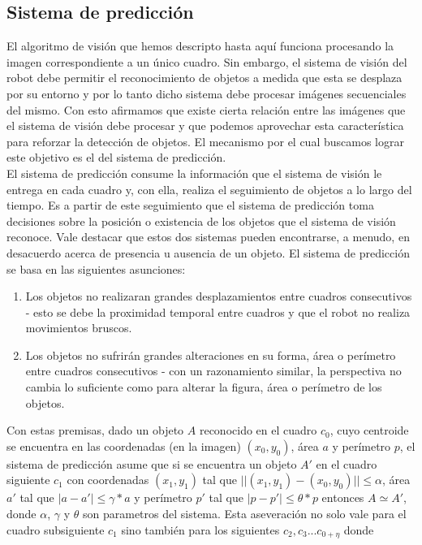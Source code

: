 	\subsection{Sistema de predicción}
	El algoritmo de visión que hemos descripto hasta aquí funciona 
	procesando la imagen correspondiente a un único cuadro. Sin embargo, 
	el sistema de visión del robot debe permitir el reconocimiento de 
	objetos a medida que esta se desplaza por su entorno y por lo tanto 
	dicho sistema debe procesar imágenes secuenciales del mismo. Con 
	esto afirmamos que existe cierta relación entre las imágenes 
	que el sistema de visión debe procesar y que podemos aprovechar esta 
	característica para reforzar la detección de objetos.  El mecanismo por el cual buscamos lograr este objetivo es el del sistema de predicción.\\
\indent 	El sistema de predicción consume la información que el 
sistema de visión le entrega en cada cuadro y, con ella, realiza el 
seguimiento de objetos a lo largo del tiempo. Es a partir de este 
seguimiento que el sistema de predicción toma decisiones sobre la 
posición o existencia de los objetos que el sistema de visión 
reconoce. Vale destacar que estos dos sistemas pueden encontrarse, a 
menudo, en desacuerdo acerca de presencia u ausencia 
de un objeto.  El sistema de predicción se basa en las siguientes asunciones:
\begin{enumerate}
\item{ Los objetos no realizaran grandes desplazamientos entre cuadros 
consecutivos - esto se debe la proximidad temporal entre cuadros y que el robot no realiza movimientos bruscos.}
\item{ Los objetos no sufrirán grandes alteraciones en su forma, área 
o perímetro entre cuadros consecutivos - con un razonamiento similar, la perspectiva no cambia lo suficiente como para alterar la figura, área o perímetro de los objetos.}
\end{enumerate} 
Con estas premisas, dado un objeto $A$ reconocido en el cuadro $c_0$, 
cuyo centroide se encuentra en las coordenadas (en la imagen) $(x_0,y_0)$, área $a$ y perímetro $p$, 
el sistema de predicción asume que si se encuentra un objeto $A'$ en 
el cuadro siguiente $c_1$ con coordenadas $(x_1, y_1)$ tal que 
$||(x_1,y_1) - (x_0,y_0)||\leq \alpha$, área $a'$ tal que $|a-a'| \leq 
\gamma *a$ y perímetro $p'$ tal que $|p-p'|\leq \theta*p$ entonces $A 
\simeq A'$, donde $\alpha$, $\gamma$ y $\theta$ son parametros del 
sistema. Esta aseveración no solo vale para el cuadro subsiguiente 
$c_1$ sino también para los siguientes $c_2,c_3 ... c_{0+\eta}$ donde 
